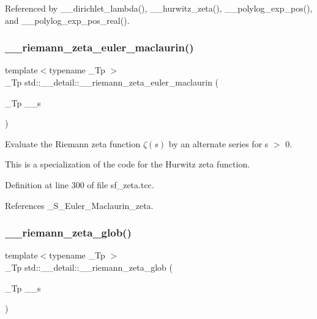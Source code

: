 Referenced by \+\_\+\+\_\+dirichlet\+\_\+lambda(), \+\_\+\+\_\+hurwitz\+\_\+zeta(), \+\_\+\+\_\+polylog\+\_\+exp\+\_\+pos(), and \+\_\+\+\_\+polylog\+\_\+exp\+\_\+pos\+\_\+real().

\mbox{\label{namespacestd_1_1____detail_a84ac805996c4eeb8cbfa181e6e47f0ae}} 
\subsubsection{\texorpdfstring{\+\_\+\+\_\+riemann\+\_\+zeta\+\_\+euler\+\_\+maclaurin()}{\_\_riemann\_zeta\_euler\_maclaurin()}}
{\footnotesize\ttfamily template$<$typename \+\_\+\+Tp $>$ \\
\+\_\+\+Tp std\+::\+\_\+\+\_\+detail\+::\+\_\+\+\_\+riemann\+\_\+zeta\+\_\+euler\+\_\+maclaurin (\begin{DoxyParamCaption}\item[{\+\_\+\+Tp}]{\+\_\+\+\_\+s }\end{DoxyParamCaption})}



Evaluate the Riemann zeta function $ \zeta(s) $ by an alternate series for s $>$ 0. 

This is a specialization of the code for the Hurwitz zeta function. 

Definition at line 300 of file sf\+\_\+zeta.\+tcc.



References \+\_\+\+S\+\_\+\+Euler\+\_\+\+Maclaurin\+\_\+zeta.

\mbox{\label{namespacestd_1_1____detail_ab3542ea44b34da3d4865ed9a014e2951}} 
\subsubsection{\texorpdfstring{\+\_\+\+\_\+riemann\+\_\+zeta\+\_\+glob()}{\_\_riemann\_zeta\_glob()}}
{\footnotesize\ttfamily template$<$typename \+\_\+\+Tp $>$ \\
\+\_\+\+Tp std\+::\+\_\+\+\_\+detail\+::\+\_\+\+\_\+riemann\+\_\+zeta\+\_\+glob (\begin{DoxyParamCaption}\item[{\+\_\+\+Tp}]{\+\_\+\+\_\+s }\end{DoxyParamCaption})}



